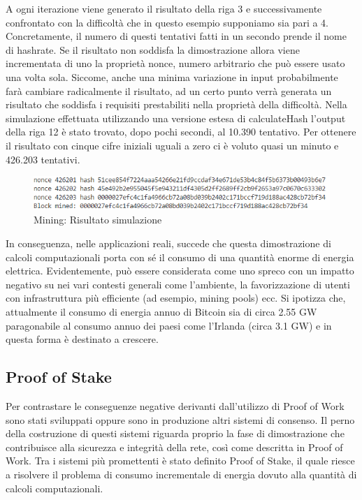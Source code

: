 A ogni iterazione viene generato il risultato della riga 3 e successivamente confrontato con la difficoltà che in questo esempio supponiamo sia pari a 4. Concretamente, il numero di questi tentativi fatti in un secondo prende il nome di hashrate. Se il risultato non soddisfa la dimostrazione allora viene incrementata di uno la proprietà nonce, numero arbitrario che può essere usato una volta sola. Siccome, anche una minima variazione in input probabilmente farà cambiare radicalmente il risultato, ad un certo punto verrà generata un risultato che soddisfa i requisiti prestabiliti nella proprietà della difficoltà. Nella simulazione effettuata utilizzando una versione estesa di calculateHash l'output della riga 12 è stato trovato, dopo pochi secondi, al 10.390 tentativo. Per ottenere il risultato con cinque cifre iniziali uguali a zero ci è voluto quasi un minuto e 426.203 tentativi.

\begin{figure}[H]
\centering
\includegraphics[width=1\textwidth]{immagini/miningOutput.png}
\caption{Mining: Risultato simulazione}
\label{fig:mesh5}
\end{figure}

In conseguenza, nelle applicazioni reali, succede che questa dimostrazione di calcoli computazionali porta con sé il consumo di una quantità enorme di energia elettrica. Evidentemente, può essere considerata come uno spreco con un impatto negativo su nei vari contesti generali come l’ambiente, la favorizzazione di utenti con infrastruttura più efficiente (ad esempio, mining pools) ecc.
Si ipotizza che, attualmente il consumo di energia annuo di Bitcoin sia di circa 2.55 GW paragonabile al consumo annuo dei paesi come l’Irlanda (circa 3.1 GW) e in questa forma è destinato a crescere.

\subsection{Proof of Stake}

Per contrastare le conseguenze negative derivanti dall’utilizzo di Proof of Work sono stati sviluppati oppure sono in produzione altri sistemi di consenso. Il perno della costruzione di questi sistemi riguarda proprio la fase di dimostrazione che contribuisce alla sicurezza e integrità della rete, così come descritta in Proof of Work. Tra i sistemi più promettenti è stato definito Proof of Stake, il quale riesce a risolvere il problema di consumo incrementale di energia dovuto alla quantità di calcoli computazionali.

